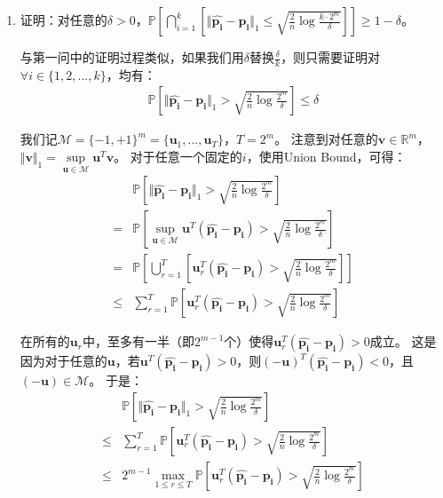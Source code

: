 \documentclass[12pt, a4paper]{article}
\newcommand{\under}[1]{\mathop{#1}\limits_}
\newcommand{\prob}{{\mathbb{P}}}
\begin{document}
\begin{enumerate}
        至此，我们即完成了对原命题的证明。

    \item 证明：对任意的$\delta > 0$，$\prob[\bigcap_{i = 1}^{k} [\Vert \bm{\hat{p_i}} - \bm{p_i} \Vert_1 \le \sqrt{\frac{2}{n} \log \frac{k \cdot 2^m}{\delta}}]] \ge 1 - \delta$。

        与第一问中的证明过程类似，如果我们用$\delta$替换$\frac{\delta}{k}$，则只需要证明对$\forall i \in \{1, 2, ..., k\}$，均有：
        \begin{align*}
        \prob[\Vert \bm{\hat{p_i}} - \bm{p_i} \Vert_1 > \sqrt{\frac{2}{n} \log \frac{2^m}{\delta}}] \le \delta
        \end{align*}

        我们记$\mathcal{M} = \{-1, +1\}^m = \{\bm{u}_1, ..., \bm{u}_T\}$，$T = 2^m$。
        注意到对任意的$\bm{v} \in \mathbb{R}^m$，$\Vert \bm{v} \Vert_1 = \under{\sup}{\bm{u} \in \mathcal{M}} \bm{u}^T \bm{v}$。
        对于任意一个固定的$i$，使用Union Bound，可得：
        \begin{align*}
        &\prob[\Vert \bm{\hat{p_i}} - \bm{p_i} \Vert_1 > \sqrt{\frac{2}{n} \log \frac{2^m}{\delta}}] \\
        =& \prob[\under{\sup}{\bm{u} \in \mathcal{M}} \bm{u}^T (\bm{\hat{p_i}} - \bm{p_i}) > \sqrt{\frac{2}{n} \log \frac{2^m}{\delta}}] \\
        =& \prob[\bigcup_{r = 1}^{T} [\bm{u}_r^T (\bm{\hat{p_i}} - \bm{p_i}) > \sqrt{\frac{2}{n} \log \frac{2^m}{\delta}}]] \\
        \le& \sum_{r = 1}^{T} \prob[\bm{u}_r^T (\bm{\hat{p_i}} - \bm{p_i}) > \sqrt{\frac{2}{n} \log \frac{2^m}{\delta}}]
        \end{align*}

        在所有的$\bm{u}_r$中，至多有一半（即$2^{m - 1}$个）使得$\bm{u}_r^T (\bm{\hat{p_i}} - \bm{p_i}) > 0$成立。
        这是因为对于任意的$\bm{u}$，若$\bm{u}^T (\bm{\hat{p_i}} - \bm{p_i}) > 0$，则$(- \bm{u})^T (\bm{\hat{p_i}} - \bm{p_i}) < 0$，且$(- \bm{u}) \in \mathcal{M}$。
        于是：
        \begin{align*}
        &\prob[\Vert \bm{\hat{p_i}} - \bm{p_i} \Vert_1 > \sqrt{\frac{2}{n} \log \frac{2^m}{\delta}}] \\
        \le& \sum_{r = 1}^{T} \prob[\bm{u}_r^T (\bm{\hat{p_i}} - \bm{p_i}) > \sqrt{\frac{2}{n} \log \frac{2^m}{\delta}}] \\
        \le& 2^{m - 1} \under{\max}{1 \le r \le T} \prob[\bm{u}_r^T (\bm{\hat{p_i}} - \bm{p_i}) > \sqrt{\frac{2}{n} \log \frac{2^m}{\delta}}]
        \end{align*}


\end{enumerate}
\end{document}
